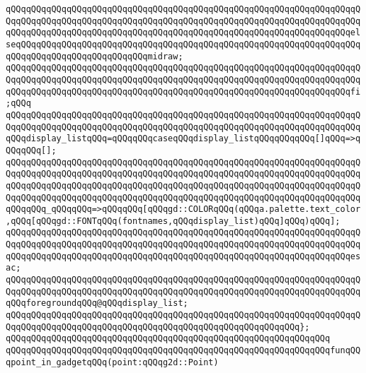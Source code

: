 \verb|qQQqqQQqqQQqqQQqqQQqqQQqqQQqqQQqqQQqqQQqqQQqqQQqqQQqqQQqqQQqqQQqqQQqqQQqqQQqqQQqqQQqqQQqqQQqqQQqqQQqqQQqqQQqqQQqqQQqqQQqqQQqqQQqqQQqqQQqqQQqqQQqqQQqqQQqqQQqqQQqqQQqqQQqqQQqqQQqqQQqqQQqqQQqqQQqqQQqqQQqqQQqqQQqelseqQQqqQQqqQQqqQQqqQQqqQQqqQQqqQQqqQQqqQQqqQQqqQQqqQQqqQQqqQQqqQQqqQQqqQQqqQQqqQQqqQQqqQQqqQQqqQQqmidraw;|\newline
\verb|qQQqqQQqqQQqqQQqqQQqqQQqqQQqqQQqqQQqqQQqqQQqqQQqqQQqqQQqqQQqqQQqqQQqqQQqqQQqqQQqqQQqqQQqqQQqqQQqqQQqqQQqqQQqqQQqqQQqqQQqqQQqqQQqqQQqqQQqqQQqqQQqqQQqqQQqqQQqqQQqqQQqqQQqqQQqqQQqqQQqqQQqqQQqqQQqqQQqqQQqqQQqqQQqfi;qQQq|\newline
\newline
\newline
\newline
\verb|qQQqqQQqqQQqqQQqqQQqqQQqqQQqqQQqqQQqqQQqqQQqqQQqqQQqqQQqqQQqqQQqqQQqqQQqqQQqqQQqqQQqqQQqqQQqqQQqqQQqqQQqqQQqqQQqqQQqqQQqqQQqqQQqqQQqqQQqqQQqqQQqdisplay_listqQQq=qQQqqQQqcaseqQQqdisplay_listqQQqqQQqqQQq[]qQQq=>qQQqqQQq[];|\newline
\verb|qQQqqQQqqQQqqQQqqQQqqQQqqQQqqQQqqQQqqQQqqQQqqQQqqQQqqQQqqQQqqQQqqQQqqQQqqQQqqQQqqQQqqQQqqQQqqQQqqQQqqQQqqQQqqQQqqQQqqQQqqQQqqQQqqQQqqQQqqQQqqQQqqQQqqQQqqQQqqQQqqQQqqQQqqQQqqQQqqQQqqQQqqQQqqQQqqQQqqQQqqQQqqQQqqQQqqQQqqQQqqQQqqQQqqQQqqQQqqQQqqQQqqQQqqQQqqQQqqQQqqQQqqQQqqQQqqQQqqQQqqQQqqQQq_qQQqqQQq=>qQQqqQQq[qQQqgd::COLORqQQq(qQQqa.palette.text_color,qQQq[qQQqgd::FONTqQQq(fontnames,qQQqdisplay_list)qQQq]qQQq)qQQq];|\newline
\verb|qQQqqQQqqQQqqQQqqQQqqQQqqQQqqQQqqQQqqQQqqQQqqQQqqQQqqQQqqQQqqQQqqQQqqQQqqQQqqQQqqQQqqQQqqQQqqQQqqQQqqQQqqQQqqQQqqQQqqQQqqQQqqQQqqQQqqQQqqQQqqQQqqQQqqQQqqQQqqQQqqQQqqQQqqQQqqQQqqQQqqQQqqQQqqQQqqQQqqQQqqQQqqQQqesac;|\newline
\newline
\verb|qQQqqQQqqQQqqQQqqQQqqQQqqQQqqQQqqQQqqQQqqQQqqQQqqQQqqQQqqQQqqQQqqQQqqQQqqQQqqQQqqQQqqQQqqQQqqQQqqQQqqQQqqQQqqQQqqQQqqQQqqQQqqQQqqQQqqQQqqQQqqQQqforegroundqQQq@qQQqdisplay_list;|\newline
\verb|qQQqqQQqqQQqqQQqqQQqqQQqqQQqqQQqqQQqqQQqqQQqqQQqqQQqqQQqqQQqqQQqqQQqqQQqqQQqqQQqqQQqqQQqqQQqqQQqqQQqqQQqqQQqqQQqqQQqqQQqqQQqqQQq};|\newline
\verb|qQQqqQQqqQQqqQQqqQQqqQQqqQQqqQQqqQQqqQQqqQQqqQQqqQQqqQQqqQQqqQQq|\newline
\newline
\verb|qQQqqQQqqQQqqQQqqQQqqQQqqQQqqQQqqQQqqQQqqQQqqQQqqQQqqQQqqQQqqQQqfunqQQqpoint_in_gadgetqQQq(point:qQQqg2d::Point)|\newline
